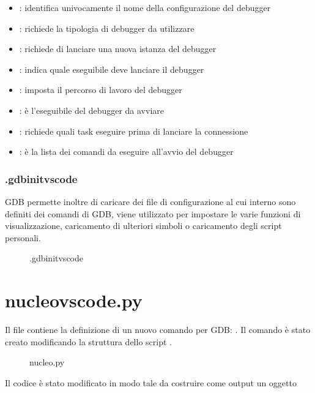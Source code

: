 \begin{itemize}
    \item {}: identifica univocamente il nome della configurazione del debugger
    \item {}: richiede la tipologia di debugger da utilizzare
    \item {}: richiede di lanciare una nuova istanza del debugger
    \item {}: indica quale eseguibile deve lanciare il debugger
    \item {}: imposta il percorso di lavoro del debugger
    \item {}: è l'eseguibile del debugger da avviare
    \item {}: richiede quali task eseguire prima di lanciare la connessione
    \item {}: è la lista dei comandi da eseguire all'avvio del debugger
\end{itemize}

\subsubsection*{.gdbinitvscode}
GDB permette inoltre di caricare dei file di configurazione al cui interno sono definiti dei comandi di GDB, viene utilizzato per impostare le varie funzioni di visualizzazione, caricamento di ulteriori simboli o caricamento degli script personali. 

\begin{figure}[H]
    
    \caption{.gdbinitvscode}
\end{figure}

\section{nucleo\textunderscore vscode.py}

Il file  contiene la definizione di un nuovo comando per GDB: . Il comando è stato creato modificando la struttura dello script . 

\begin{figure}[H]
    
    \caption{nucleo.py}
\end{figure}

Il codice è stato modificato in modo tale da costruire come output un oggetto 

